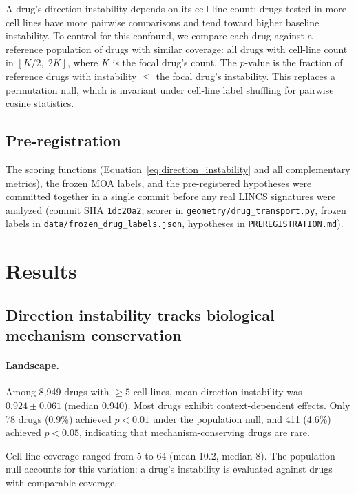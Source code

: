 \documentclass{article}
\begin{document}
A drug's direction instability depends on its cell-line count: drugs tested
in more cell lines have more pairwise comparisons and tend toward higher
baseline instability. To control for this confound, we compare each drug
against a reference population of drugs with similar coverage: all drugs
with cell-line count in $[K/2,\; 2K]$, where $K$ is the focal drug's count.
The $p$-value is the fraction of reference drugs with instability $\leq$
the focal drug's instability. This replaces a permutation null, which
is invariant under cell-line label shuffling for pairwise cosine statistics.

\subsection{Pre-registration}
\label{sec:prereg}

The scoring functions (Equation~\ref{eq:direction_instability} and all
complementary metrics), the frozen MOA labels, and the pre-registered
hypotheses were committed together in a single commit before any real
LINCS signatures were analyzed (commit SHA \texttt{1dc20a2}; scorer in
\texttt{geometry/drug\_transport.py}, frozen labels in
\texttt{data/frozen\_drug\_labels.json}, hypotheses in
\texttt{PREREGISTRATION.md}).

\section{Results}

\subsection{Direction instability tracks biological mechanism conservation}

\paragraph{Landscape.}

Among 8{,}949 drugs with $\geq5$ cell lines, mean direction instability
was $0.924 \pm 0.061$ (median 0.940). Most drugs exhibit context-dependent
effects. Only 78 drugs (0.9\%) achieved $p < 0.01$ under the population
null, and 411 (4.6\%) achieved $p < 0.05$, indicating that mechanism-conserving drugs are rare.

Cell-line coverage ranged from 5 to 64 (mean 10.2, median 8). The
population null accounts for this variation: a drug's instability is
evaluated against drugs with comparable coverage.
\end{document}
